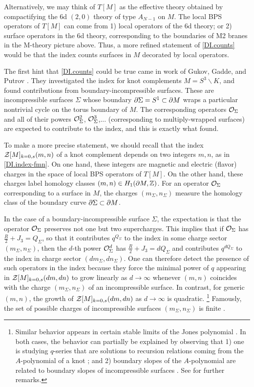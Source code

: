 \documentclass[12pt]{article}
\begin{document}
Alternatively, we may think of $T[M]$ as the effective theory obtained by compactifying the 6d $(2,0)$ theory of type $A_{N-1}$ on $M$. The local BPS operators of $T[M]$ can come from 1) local operators of the 6d theory; or 2) surface operators in the 6d theory, corresponding to the boundaries of M2 branes in the M-theory picture above. Thus, a more refined statement of \eqref{DI.counts} would be that the index counts surfaces in $M$ decorated by local operators.


The first hint that \eqref{DI.counts} could be true came in work of Gukov, Gadde, and Putrov \cite{DIGGP-walls}. They investigated the index for knot complements $M=S^3\backslash K$, and found contributions from boundary-incompressible surfaces. These are incompressible surfaces $\Sigma$ whose boundary $\partial \Sigma = S^1\subset \partial M$ wraps a particular nontrivial cycle on the torus boundary of $M$. The corresponding operators $\mathcal{O}_\Sigma$ and all of their powers $\mathcal{O}_\Sigma^2$, $\mathcal{O}_\Sigma^3$,...  (corresponding to multiply-wrapped surfaces) are expected to contribute to the index, and this is exactly what \cite{DIGGP-walls} found.

To make a more precise statement, we should recall that the index $\mathcal{Z}[M]_{k=0,s}(m,n)$ of a knot complement  depends on two integers $m,n$, as in \eqref{DI.index-fmn}. On one hand, these integers are magnetic and electric (flavor) charges in the space of local BPS operators of $T[M]$. On the other hand, these charges label homology classes $(m,n)\in H_1(\partial M,{\mathbb Z})$.
For an operator $\mathcal{O}_\Sigma$ corresponding to a surface in $M$, the charges $(m_\Sigma,n_\Sigma)$ measure the homology class of the boundary curve $\partial \Sigma\subset \partial M$.

In the case of a boundary-incompressible surface $\Sigma$, the expectation is that the operator $\mathcal{O}_\Sigma$  preserves not one but two supercharges. This implies that if $\mathcal{O}_\Sigma$ has $\frac R2+J_3=Q_\Sigma$, so that it contributes $q^{Q_\Sigma}$ to the index in some charge sector $(m_\Sigma,n_\Sigma)$, then the $d$-th power $\mathcal{O}_\Sigma^d$ has $\frac R2+J_3=dQ_\Sigma$ and contributes $q^{dQ_\Sigma}$ to the index in charge sector $(dm_\Sigma,dn_\Sigma)$. One can therefore detect the presence of such operators in the index because they force the minimal power of $q$ appearing in $\mathcal{Z}[M]_{k=0,s}(dm,dn)$ to grow linearly as $d\to \infty$ whenever $(m,n)$ coincides with the charge $(m_\Sigma,n_\Sigma)$ of an incompressible surface.
In contrast, for generic $(m,n)$, the growth of $\mathcal{Z}[M]_{k=0,s}(dm,dn)$ as $d\to \infty$ is quadratic.%
%
\footnote{Similar behavior appears in certain stable limits of the Jones polynomial \cite{DIGaroufalidis-slopes}. In both cases, the behavior can partially be explained by observing that 1) one is studying $q$-series that are solutions to recursion relations coming from the $A$-polynomial of a knot \cite{DIgukov-2003, DIgaroufalidis-2004, DIDGG-index}; and 2) boundary slopes of the $A$-polynomial are related to boundary slopes of incompressible surfaces \cite{DIcooper-1994}. See \cite[App. D]{DIDGG-index} for further remarks.} %
%
Famously, the set of possible charges of incompressible surfaces $(m_\Sigma,n_\Sigma)$ is finite \cite{DIHatcher-bdy}. 
\end{document}
